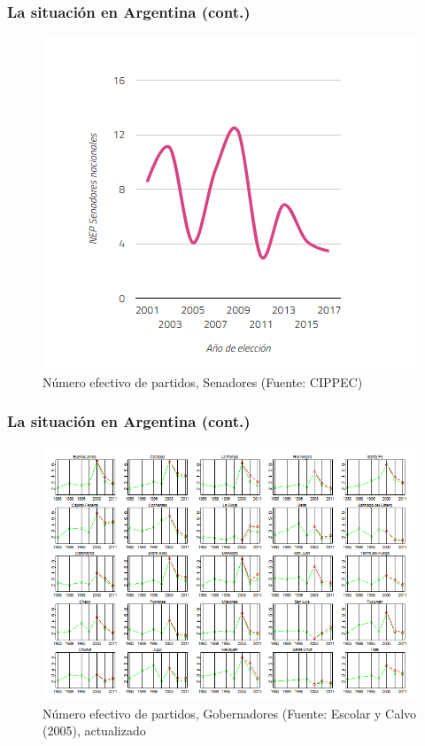 \documentclass[a4paper,handout,mathserif,final,xcolor=dvipsnames,twocolumn]{beamer}
\begin{document}
 \begin{frame}\frametitle{La situación en Argentina (cont.)}
 \begin{figure}[htbp]
    \centering
    \includegraphics[scale=0.625]{grafico3}
    \caption{Número efectivo de partidos, Senadores (Fuente: CIPPEC)}
    \label{fig:1}
  \end{figure}
    \end{frame}


 \begin{frame}\frametitle{La situación en Argentina (cont.)}
 \begin{figure}[htbp]
    \centering \vspace{-0.25cm}
    \includegraphics[scale=0.35]{grafico4}
    \caption{Número efectivo de partidos, Gobernadores (Fuente:
      Escolar y Calvo (2005), actualizado}
    \label{fig:1}
  \end{figure}
    \end{frame}
\end{document}
